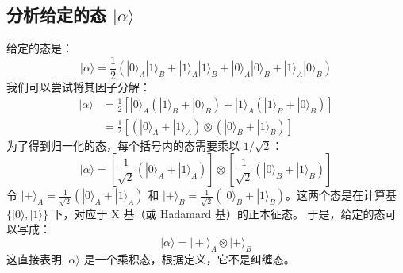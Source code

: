 \documentclass[12pt, a4paper]{article}
\newcommand{\otimesop}{\otimes}
\begin{document}
\subsection*{分析给定的态 \(|\alpha\rangle\)}
给定的态是：
\[ |\alpha\rangle = \frac{1}{2} (|0\rangle_A|1\rangle_B + |1\rangle_A|1\rangle_B + |0\rangle_A|0\rangle_B + |1\rangle_A|0\rangle_B) \]
我们可以尝试将其因子分解：
\begin{align*} |\alpha\rangle &= \frac{1}{2} [ |0\rangle_A(|1\rangle_B + |0\rangle_B) + |1\rangle_A(|1\rangle_B + |0\rangle_B) ] \\ &= \frac{1}{2} [ (|0\rangle_A + |1\rangle_A) \otimesop (|0\rangle_B + |1\rangle_B) ] \end{align*}
为了得到归一化的态，每个括号内的态需要乘以 \(1/\sqrt{2}\)：
\[ |\alpha\rangle = \left[ \frac{1}{\sqrt{2}}(|0\rangle_A + |1\rangle_A) \right] \otimesop \left[ \frac{1}{\sqrt{2}}(|0\rangle_B + |1\rangle_B) \right] \]
令 \(|+\rangle_A = \frac{1}{\sqrt{2}}(|0\rangle_A + |1\rangle_A)\) 和 \(|+\rangle_B = \frac{1}{\sqrt{2}}(|0\rangle_B + |1\rangle_B)\)。这两个态是在计算基 \(\{|0\rangle, |1\rangle\}\) 下，对应于 X 基（或 Hadamard 基）的正本征态。
于是，给定的态可以写成：
\[ |\alpha\rangle = |+\rangle_A \otimesop |+\rangle_B \]
这直接表明 \(|\alpha\rangle\) 是一个乘积态，根据定义，它不是纠缠态。
\end{document}
